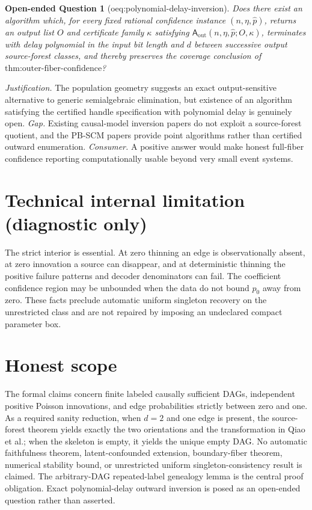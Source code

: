 \documentclass{article}
\newtheorem{openendedquestion}{Open-ended Question}
\begin{document}
\begin{openendedquestion}[oeq:polynomial-delay-inversion]\label{oeq:polynomial-delay-inversion}
Does there exist an algorithm which, for every fixed rational confidence instance \((n,\eta,\widehat p)\), returns an output list \(O\) and certificate family \(\kappa\) satisfying \(\mathsf A_{\mathrm{out}}(n,\eta,\widehat p;O,\kappa)\), terminates with delay polynomial in the input bit length and \(d\) between successive output source-forest classes, and thereby preserves the coverage conclusion of \(\text{thm:outer-fiber-confidence}\)?
\end{openendedquestion}
\par\smallskip\noindent \textit{Justification.} The population geometry suggests an exact output-sensitive alternative to generic semialgebraic elimination, but existence of an algorithm satisfying the certified handle specification with polynomial delay is genuinely open. \textit{Gap.} Existing causal-model inversion papers do not exploit a source-forest quotient, and the PB-SCM papers provide point algorithms rather than certified outward enumeration. \textit{Consumer.} A positive answer would make honest full-fiber confidence reporting computationally usable beyond very small event systems.

\section*{Technical internal limitation (diagnostic only)}

The strict interior is essential. At zero thinning an edge is observationally absent, at zero innovation a source can disappear, and at deterministic thinning the positive failure patterns and decoder denominators can fail. The coefficient confidence region may be unbounded when the data do not bound \(p_0\) away from zero. These facts preclude automatic uniform singleton recovery on the unrestricted class and are not repaired by imposing an undeclared compact parameter box.

\section{Honest scope}

The formal claims concern finite labeled causally sufficient DAGs, independent positive Poisson innovations, and edge probabilities strictly between zero and one. As a required sanity reduction, when \(d=2\) and one edge is present, the source-forest theorem yields exactly the two orientations and the transformation in Qiao et al.; when the skeleton is empty, it yields the unique empty DAG. No automatic faithfulness theorem, latent-confounded extension, boundary-fiber theorem, numerical stability bound, or unrestricted uniform singleton-consistency result is claimed. The arbitrary-DAG repeated-label genealogy lemma is the central proof obligation. Exact polynomial-delay outward inversion is posed as an open-ended question rather than asserted.
\end{document}
